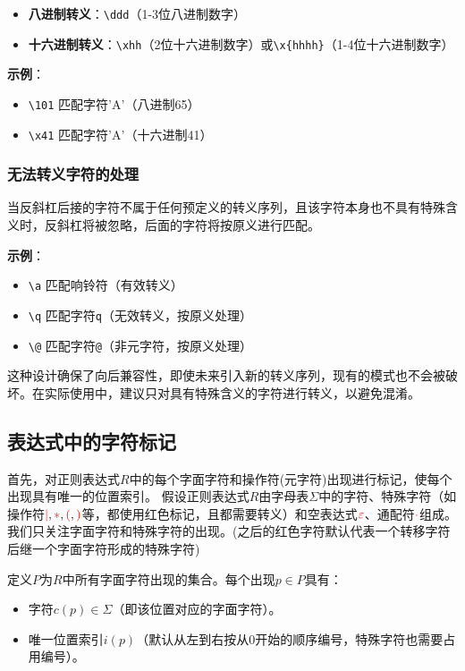 \documentclass[12pt,a4paper,UTF8]{ctexart}
\newcommand{\func}[1]{\textcolor{red}{#1}}
\begin{document}
\begin{itemize}
    \item \textbf{八进制转义}：\verb|\ddd|（1-3位八进制数字）
    \item \textbf{十六进制转义}：\verb|\xhh|（2位十六进制数字）或\verb|\x{hhhh}|（1-4位十六进制数字）
\end{itemize}

\textbf{示例}：
\begin{itemize}
    \item \verb|\101| 匹配字符'A'（八进制65）
    \item \verb|\x41| 匹配字符'A'（十六进制41）
\end{itemize}

\subsubsection{无法转义字符的处理}

\qquad 当反斜杠后接的字符不属于任何预定义的转义序列，且该字符本身也不具有特殊含义时，反斜杠将被忽略，后面的字符将按原义进行匹配。

\textbf{示例}：
\begin{itemize}
    \item \verb|\a| 匹配响铃符（有效转义）
    \item \verb|\q| 匹配字符\verb|q|（无效转义，按原义处理）
    \item \verb|\@| 匹配字符\verb|@|（非元字符，按原义处理）
\end{itemize}

\qquad 这种设计确保了向后兼容性，即使未来引入新的转义序列，现有的模式也不会被破坏。在实际使用中，建议只对具有特殊含义的字符进行转义，以避免混淆。

\subsection{表达式中的字符标记}

\qquad 首先，对正则表达式$R$中的每个字面字符和操作符(元字符)出现进行标记，使每个出现具有唯一的位置索引。
假设正则表达式$R$由字母表$\Sigma$中的字符、特殊字符（如操作符$\func{\mid}, \func{*}, \func{(}, \func{)}$等，都使用红色标记，且都需要转义）和空表达式$\func{\varepsilon}$、通配符$\func{\cdot}$组成。
我们只关注字面字符和特殊字符的出现。(之后的红色字符默认代表一个转移字符后继一个字面字符形成的特殊字符)

\qquad 定义$P$为$R$中所有字面字符出现的集合。每个出现$p \in P$具有：
\begin{itemize}
    \item 字符$c(p) \in \Sigma$（即该位置对应的字面字符）。
    \item 唯一位置索引$i(p)$（默认从左到右按从$0$开始的顺序编号，特殊字符也需要占用编号）。
\end{itemize}
\end{document}
